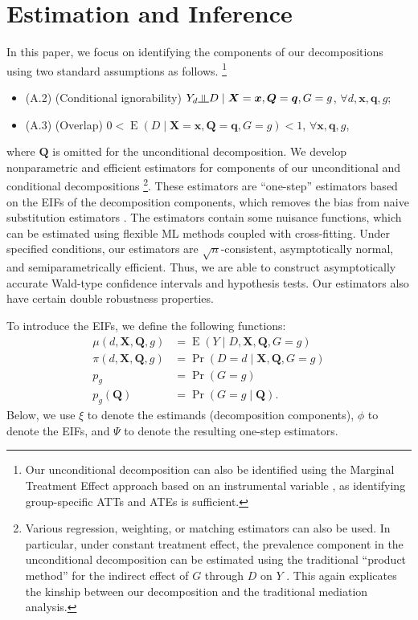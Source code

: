 \documentclass[12pt,a4paper]{article}
\newcommand{\indep}{\rotatebox[origin=c]{90}{$\models$}}  %
\newcommand{\E}{\operatorname{E}}
\def\X{{\boldsymbol X}}
\def\x{{\boldsymbol x}}
\def\Q{{\boldsymbol Q}}
\def\q{{\boldsymbol q}}
\DeclareMathOperator{\Pro}{Pr}
\begin{document}
\section{Estimation and Inference}
In this paper, we focus on identifying the components of our decompositions using two standard assumptions as follows. \footnote{Our unconditional decomposition can also be identified using the Marginal Treatment Effect approach based on an instrumental variable \citep{heckman_structural_2005, zhou_heterogeneous_2020}, as identifying group-specific ATTs and ATEs is sufficient.}
\begin{itemize}
    \item[] (A.2) (Conditional ignorability) $Y_d \indep D \mid \X=\x, \Q=\q, G=g$, $\forall d, \x, \q, g$;
    \item[] (A.3) (Overlap) $0 < \E(D \mid \X=\x, \Q=\q, G=g) <1$, $\forall \x, \q, g$,
\end{itemize}
where $\Q$ is omitted for the unconditional decomposition. 
We develop nonparametric and efficient estimators for components of our unconditional and conditional decompositions 
\footnote{Various regression, weighting, or matching estimators can also be used. In particular, under constant treatment effect, the prevalence component in the unconditional decomposition can be estimated using the traditional ``product method'' for the indirect effect of $G$ through $D$ on $Y$ \citep{baron_moderator-mediator_1986}. This again explicates the kinship between our decomposition and the traditional mediation analysis. }. 
These estimators are ``one-step'' estimators based on the EIFs of the decomposition components, which removes the bias from naive substitution estimators \citep{bickel_efficient_1998, van_der_vaart_asymptotic_2000,hines_demystifying_2022}. The estimators contain some nuisance functions, which can be estimated using flexible ML methods coupled with cross-fitting. Under specified conditions, our estimators are $\sqrt{n}$-consistent, asymptotically normal, and semiparametrically efficient. Thus, we are able to construct asymptotically accurate Wald-type confidence intervals and hypothesis tests. Our estimators also have certain double robustness properties.  


To introduce the EIFs, we define the following functions:
\begin{align*}
    \mu(d,\X,\Q, g)&=\E(Y \mid D, \X, \Q, G=g) \\
    \pi(d,\X, \Q, g) &= \Pro(D=d \mid \X, \Q, G=g) \\
    p_g &= \Pro(G=g) \\
    p_g(\Q) &= \Pro(G=g \mid \Q).
\end{align*}
Below, we use $\xi$ to denote the estimands (decomposition components), $\phi$ to denote the EIFs, and $\Psi$ to denote the resulting one-step estimators. 
\end{document}
